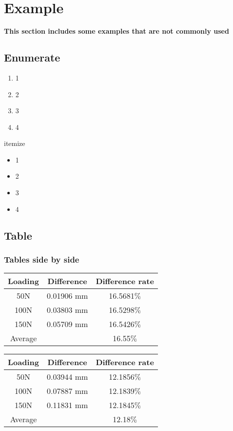 \section{Example}
\label{sec:Example}
\textbf{This section includes some examples that are not commonly used}
\subsection{Enumerate}
\begin{enumerate}
	\item 1
	\item 2
	\item 3
	\item 4
\end{enumerate}
itemize
\begin{itemize}
	\item 1
	\item 2
	\item 3
	\item 4
\end{itemize}
\newpage


\subsection{Table}

\subsubsection{Tables side by side}
\begin{minipage}[c]{0.5\textwidth}
	\label{T 4.1}
	\centering
	\begin{tabular}{@{}ccc@{}}
		\toprule
		Loading & Difference & Difference rate \\ \midrule
		50N     & 0.01906 mm & 16.5681$\%$     \\
		100N    & 0.03803 mm & 16.5298$\%$     \\
		150N    & 0.05709 mm & 16.5426$\%$     \\ \midrule
		Average &            & 16.55$\%$           \\ \bottomrule
	\end{tabular}
\end{minipage}
\begin{minipage}[c]{0.5\textwidth}
	\label{T 4.2}
	\centering
	\begin{tabular}{@{}ccc@{}}
		\toprule
		Loading & Difference & Difference rate \\ \midrule
		50N     & 0.03944 mm & 12.1856$\%$     \\
		100N    & 0.07887 mm & 12.1839$\%$     \\
		150N    & 0.11831 mm & 12.1845$\%$     \\ \midrule
		Average &            & 12.18$\%$           \\ \bottomrule
	\end{tabular}
\end{minipage}

